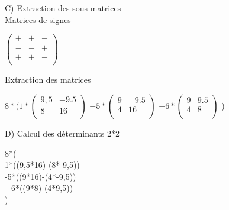 \vspace{10mm} %

C) Extraction des sous matrices \\

\vspace{5mm} %
Matrices de signes \\

\vspace{5mm} %

$
\begin{pmatrix}
  + & + & - \\
  - & - & + \\
  + & + & - \\
\end{pmatrix}
$


\vspace{10mm} %
Extraction des matrices \\
\vspace{5mm} %

$
8*(
  1*
  \begin{pmatrix}
    9,5 & -9.5 \\
    8 & 16 \\
  \end{pmatrix}
  $
  $
  -5*
  \begin{pmatrix}
    9 & -9.5 \\
    4 & 16 \\
  \end{pmatrix}
  $
  $
  +6*
  \begin{pmatrix}
    9 & 9.5 \\
    4 & 8 \\
  \end{pmatrix}
  $
)

\newpage

D) Calcul des déterminants 2*2 \\

\vspace{5mm} %

8*(\\

1*((9,5*16)-(8*-9,5))\\

-5*((9*16)-(4*-9,5))\\

+6*((9*8)-(4*9,5))\\

)

\vspace{10mm} %

